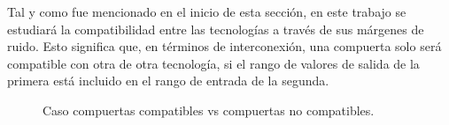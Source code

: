 Tal y como fue mencionado en el inicio de esta sección, en este trabajo se estudiará la compatibilidad entre las tecnologías a través de sus márgenes de ruido.
Esto significa que, en términos de interconexión, una compuerta solo será compatible con otra de otra tecnología, si el rango de valores de salida de la primera está 
incluido en el rango de entrada de la segunda.

\begin{figure}[]
    \centering
    
    \caption{Caso compuertas compatibles vs compuertas no compatibles.}
    \label{fig:compatible_v_non_compatible_ex5}
\end{figure}